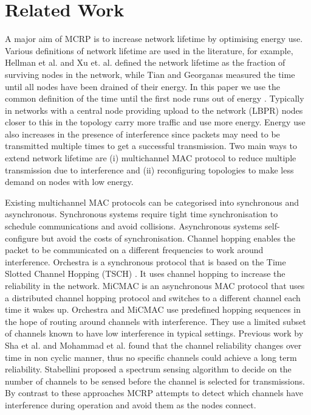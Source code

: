 \section{Related Work}
\label{RelatedWork}

 A major aim of MCRP is to increase network lifetime by optimising energy use. Various definitions of network lifetime are used in the literature, for example, Hellman et al. \cite{hellmanLifetime} and Xu et. al. \cite{gafLifetime} defined the network lifetime as the fraction of surviving nodes in the network, while Tian and Georganas \cite{tian2002coverage} measured the time until all nodes have been drained of their energy.
In this paper we use the common definition of the time until the first node runs out of energy \cite{maxmin, erapl, lifetimedef1}.  Typically in networks with a central node providing upload to the network (LBPR) nodes closer to this in the topology carry more traffic and use more energy.  Energy use also increases in the presence of interference since packets may need to be transmitted multiple times to get a successful transmission. Two main ways to extend network lifetime are (i) multichannel MAC protocol to reduce multiple transmission due to interference and (ii) reconfiguring topologies to make less demand on nodes with low energy.

Existing multichannel MAC protocols can be categorised into synchronous and asynchronous. Synchronous systems require tight time synchronisation to schedule communications and avoid collisions. Asynchronous systems self-configure but avoid the costs of synchronisation.
Channel hopping enables the packet to be communicated on a different frequencies to work around interference.  Orchestra \cite{orchestra} is a synchronous protocol that is based on the Time Slotted Channel Hopping (TSCH) \cite{tsch}. It uses channel hopping to increase the reliability in the network.  MiCMAC \cite{micmac} is an asynchronous MAC protocol that uses a distributed channel hopping protocol and switches to a different channel each time it wakes up.  Orchestra and MiCMAC use predefined hopping sequences in the hope of routing around channels with interference.  They use a limited subset of channels known to have low interference in typical settings. Previous work by Sha et al. \cite{homearea} and Mohammad et al. \cite{oppcast} found that the channel reliability changes over time in non cyclic manner, thus no specific channels could achieve a long term reliability. Stabellini \cite{energyluca} proposed a spectrum sensing algorithm to decide on the number of channels to be sensed before the channel is selected for transmissions.  By contrast to these approaches MCRP attempts to detect which channels have interference during operation and avoid them as the nodes connect.

